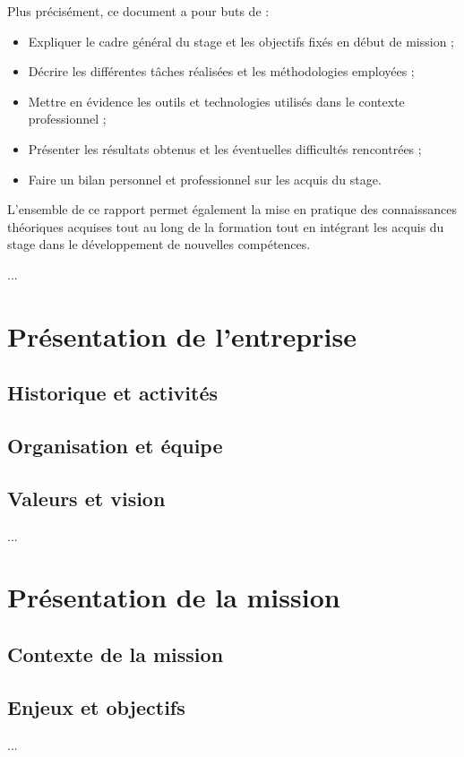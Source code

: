 \documentclass[12pt,a4paper]{report}
\begin{document}
Plus précisément, ce document a pour buts de :
\begin{itemize}
  \item Expliquer le cadre général du stage et les objectifs fixés en début de mission ;
  \item Décrire les différentes tâches réalisées et les méthodologies employées ;
  \item Mettre en évidence les outils et technologies utilisés dans le contexte professionnel ;
  \item Présenter les résultats obtenus et les éventuelles difficultés rencontrées ;
  \item Faire un bilan personnel et professionnel sur les acquis du stage.
\end{itemize}

L'ensemble de ce rapport permet également la mise en pratique des connaissances théoriques acquises tout au long de la formation tout en intégrant les acquis du stage dans le développement de nouvelles compétences.


... %

\chapter{Présentation de l'entreprise}
\section{Historique et activités}
\section{Organisation et équipe}
\section{Valeurs et vision}
... %

\chapter{Présentation de la mission}
\section{Contexte de la mission}
\section{Enjeux et objectifs}
... %
\end{document}
